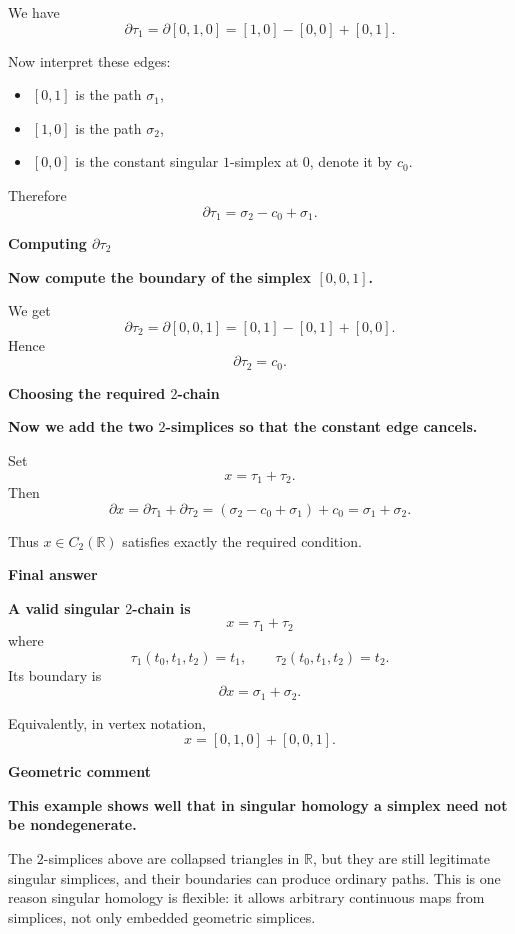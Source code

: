\begin{solution}
We have
\[
\partial\tau_1
=
\partial[0,1,0]
=
[1,0]-[0,0]+[0,1].
\]

Now interpret these edges:

\begin{itemize}
	\item \([0,1]\) is the path \(\sigma_1\),
	\item \([1,0]\) is the path \(\sigma_2\),
	\item \([0,0]\) is the constant singular \(1\)-simplex at \(0\), denote it by \(c_0\).
\end{itemize}

Therefore
\[
\partial\tau_1=\sigma_2-c_0+\sigma_1.
\]


\medskip
\noindent\textbf{Computing \(\partial \tau_2\)}\par
\smallskip


\textbf{Now compute the boundary of the simplex \([0,0,1]\).}

We get
\[
\partial\tau_2
=
\partial[0,0,1]
=
[0,1]-[0,1]+[0,0].
\]
Hence
\[
\partial\tau_2=c_0.
\]


\medskip
\noindent\textbf{Choosing the required \(2\)-chain}\par
\smallskip


\textbf{Now we add the two \(2\)-simplices so that the constant edge cancels.}

Set
\[
x=\tau_1+\tau_2.
\]
Then
\[
\partial x
=
\partial\tau_1+\partial\tau_2
=
(\sigma_2-c_0+\sigma_1)+c_0
=
\sigma_1+\sigma_2.
\]

Thus \(x\in C_2(\mathbb{R})\) satisfies exactly the required condition.


\medskip
\noindent\textbf{Final answer}\par
\smallskip


\textbf{A valid singular \(2\)-chain is}
\[
\boxed{x=\tau_1+\tau_2}
\]
where
\[
\tau_1(t_0,t_1,t_2)=t_1,
\qquad
\tau_2(t_0,t_1,t_2)=t_2.
\]
Its boundary is
\[
\boxed{\partial x=\sigma_1+\sigma_2.}
\]

Equivalently, in vertex notation,
\[
\boxed{x=[0,1,0]+[0,0,1].}
\]


\medskip
\noindent\textbf{Geometric comment}\par
\smallskip


\textbf{This example shows well that in singular homology a simplex need not be nondegenerate.}

The \(2\)-simplices above are collapsed triangles in \(\mathbb{R}\), but they are still legitimate singular simplices, and their boundaries can produce ordinary paths. This is one reason singular homology is flexible: it allows arbitrary continuous maps from simplices, not only embedded geometric simplices.
\end{solution}

